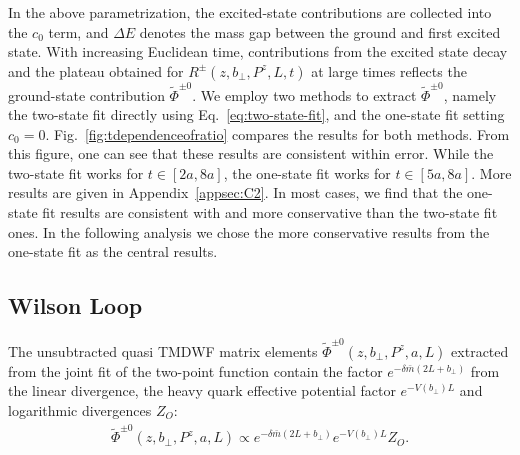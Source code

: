 \documentclass[prd,aps,twocolumn,preprintnumbers, showpacs, nofootinbib,superscriptaddress,notitlepage]{revtex4-1}
\newcommand{\red}[1]{\textcolor{red}{#1}} %
\newcommand\bl{\color{blue}}
\begin{document}
 
In the above parametrization,  the excited-state contributions are collected into the $c_0$ term, and $\Delta E$ denotes the mass gap between the ground and first excited state.  With {\bl increasing Euclidean time}, contributions from the excited state {\bl decay} and the plateau {\bl obtained for}  $R^{\pm}\left(z,b_{\perp},P^z,L,t \right)$ at  large {\bl times} reflects the ground-state contribution $\tilde{\Phi}^{\pm0}$. {\bl We} employ two methods to extract {\bl $\tilde{\Phi}^{\pm0}$,} namely the two-state fit directly using Eq.~\eqref{eq:two-state-fit}, and the one-state fit {\bl setting} $c_0=0$. Fig.~\ref{fig:tdependenceofratio} {\bl compares the results for both} methods. From this figure,  one can see that {\bl these results are consistent within error. While the two-state fit works for $t\in[2a, 8a]$, the one-state fit works for $t\in[5a, 8a]$}.   More results  are given {\bl in Appendix}~\ref{appsec:C2}. In most cases,  we find that the one-state fit results are consistent with and   more conservative than {\bl the two-state fit ones. In the following analysis we chose} the more conservative results from the one-state fit as the central results. 



\subsection{Wilson Loop}
\label{subsec:numerical_wl}


The unsubtracted quasi TMDWF matrix elements $\tilde{\Phi}^{\pm0}\left(z,b_{\perp},P^z,a,L\right)$ extracted from the joint fit of the  two-point function {\bl contain the factor $e^{-\delta \bar{m}(2L+b_{\perp})}$ from the linear divergence, the } heavy quark effective potential factor $e^{-V(b_{\perp})L}$ and logarithmic divergences $Z_{O}$:
\begin{align}
\tilde{\Phi}^{\pm0}\left(z,b_{\perp},P^z,a,L\right) \propto e^{-\delta \bar{m}(2L+b_{\perp})}e^{-V(b_{\perp})L}Z_{O}.
\end{align} 
\end{document}
